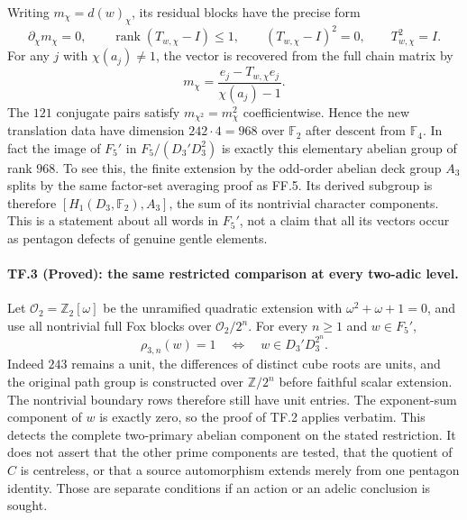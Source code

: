 Writing $m_\chi=d(w)_\chi$, its residual blocks have the
precise form
\[
 \partial_\chi m_\chi=0,\qquad
 \operatorname{rank}(T_{w,\chi}-I)\leq1,
 \qquad (T_{w,\chi}-I)^2=0,
 \qquad T_{w,\chi}^2=I.
 \tag{TF.2e}
\]
For any $j$ with $\chi(a_j)\ne1$, the vector is recovered
from the full chain matrix by
\[
                  m_\chi=
             \frac{e_j-T_{w,\chi}e_j}{\chi(a_j)-1}.
\]
The $121$ conjugate pairs satisfy
$m_{\chi^2}=m_\chi^2$ coefficientwise. Hence the new
translation data have dimension $242\cdot4=968$ over
$\mathbb F_2$ after descent from $\mathbb F_4$.
In fact the image of $F_5'$ in $F_5/(D_3'D_3^2)$ is
exactly this elementary abelian group of rank $968$.
To see this, the finite extension by the odd-order
abelian deck group $A_3$ splits by the same factor-set
averaging proof as FF.5. Its derived subgroup is therefore
$[H_1(D_3,\mathbb F_2),A_3]$, the sum of its nontrivial
character components. This is a statement about all
words in $F_5'$, not a claim that all its vectors occur
as pentagon defects of genuine gentle elements.

\paragraph{TF.3 (Proved): the same restricted comparison at every two-adic level.}
Let $\mathcal O_2=\mathbb Z_2[\omega]$ be the unramified
quadratic extension with $\omega^2+\omega+1=0$, and
use all nontrivial full Fox blocks over
$\mathcal O_2/2^n$. For every $n\geq1$ and $w\in F_5'$,
\[
 \boxed{\quad
        \rho_{3,n}(w)=1
        \quad\Longleftrightarrow\quad
                    w\in D_3'D_3^{2^n}.\quad}
 \tag{TF.3a}
\]
Indeed $243$ remains a unit, the differences of distinct
cube roots are units, and the original path group is
constructed over $\mathbb Z/2^n$ before faithful scalar
extension. The nontrivial boundary rows therefore still
have unit entries. The exponent-sum component of $w$
is exactly zero, so the proof of TF.2 applies verbatim.
This detects the complete two-primary abelian component
on the stated restriction. It does not assert that the
other prime components are tested, that the quotient of
$C$ is centreless, or that a source automorphism extends
merely from one pentagon identity. Those are separate
conditions if an action or an adelic conclusion is sought.
